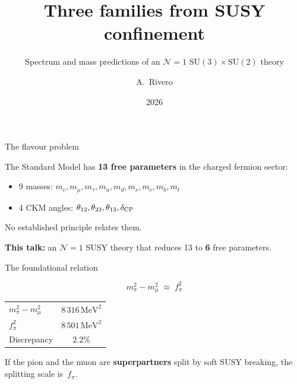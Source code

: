 \documentclass[aspectratio=169,12pt]{beamer}
\title{Three families from SUSY confinement}
\subtitle{Spectrum and mass predictions of an
$\mathcal{N}=1$ $\mathrm{SU}(3)\times\mathrm{SU}(2)$ theory}
\author{A.~Rivero}
\institute{Universidad de Zaragoza}
\date{2026}
\newcommand{\MeV}{\,\text{MeV}}
\newcommand{\fpi}{f_\pi}
\begin{document}
\begin{frame}
\titlepage
\end{frame}

\begin{frame}{The flavour problem}

The Standard Model has \textbf{13 free parameters} in the
charged fermion sector:
\begin{itemize}
\item 9 masses: $m_e, m_\mu, m_\tau, m_u, m_d, m_s, m_c, m_b, m_t$
\item 4 CKM angles: $\theta_{12}, \theta_{23}, \theta_{13}, \delta_{\rm CP}$
\end{itemize}

\bigskip
No established principle relates them.

\bigskip
\textbf{This talk:} an $\mathcal{N}=1$ SUSY theory that
reduces 13 to \textbf{6} free parameters.

\end{frame}

\begin{frame}{The foundational relation}

\begin{equation*}
\boxed{m_\pi^2 - m_\mu^2 \;\approx\; \fpi^2}
\end{equation*}

\bigskip
\begin{center}
\begin{tabular}{lc}
$m_\pi^2 - m_\mu^2$ & $8\,316\MeV^2$ \\
$\fpi^2$ & $8\,501\MeV^2$ \\
Discrepancy & $2.2\%$
\end{tabular}
\end{center}

\bigskip
If the pion and the muon are \textbf{superpartners}
split by soft SUSY breaking, the splitting scale is~$\fpi$.

\end{frame}
\end{document}
